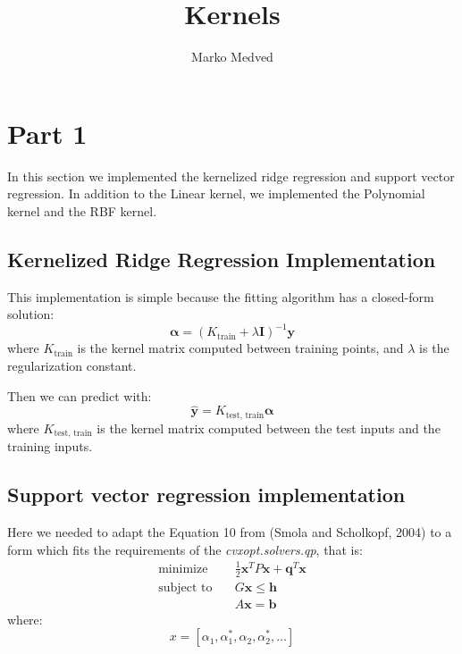 \documentclass[9pt]{IEEEtran}
\title{\vspace{0ex}
Kernels}
\author{Marko Medved\vspace{-4.0ex}}
\begin{document}
\maketitle


\section{Part 1}

In this section we implemented the kernelized ridge regression and support vector
regression. In addition to the Linear kernel, we implemented the Polynomial kernel 
and the RBF kernel.

\subsection{Kernelized Ridge Regression Implementation}

This implementation is simple because the fitting algorithm has a closed-form solution:
\[
\boldsymbol{\alpha} = (K_{\text{train}} + \lambda \mathbf{I})^{-1} \mathbf{y}
\]
where \( K_{\text{train}} \) is the kernel matrix computed between training points, and \( \lambda \) is the regularization constant.

Then we can predict with:
\[
\hat{\mathbf{y}} = K_{\text{test, train}} \boldsymbol{\alpha}
\]
where \( K_{\text{test, train}} \) is the kernel matrix computed between the test inputs and the training inputs.




\subsection{Support vector regression implementation}
Here we needed to adapt the Equation 10 from (Smola and Scholkopf, 2004) to a form
 which fits 
the requirements of the \textit{cvxopt.solvers.qp}, that is: 
\[
\begin{aligned}
\text{minimize} \quad & \frac{1}{2} \mathbf{x}^T P \mathbf{x} + \mathbf{q}^T \mathbf{x} \\
\text{subject to} \quad & G \mathbf{x} \leq \mathbf{h} \\
                        & A \mathbf{x} = \mathbf{b}
\end{aligned}
\]
where:
\[
x = \left[ \alpha_1, \alpha_1^*, \alpha_2, \alpha_2^*, \ldots \right]
\]
\end{document}
